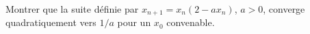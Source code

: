 Montrer que la suite définie par $x_{n+1} = x_n(2 - ax_n)$, $a > 0$, converge quadratiquement vers $1/a$ pour un $x_0$ convenable.
